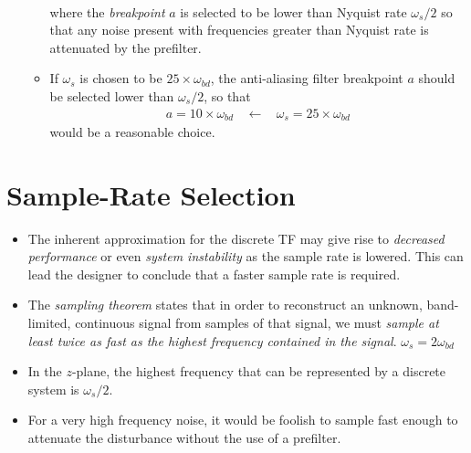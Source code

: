 \documentclass[landscape,14pt]{oblivoir}
\begin{document}
\begin{itemize}
\begin{itemize}
\begin{align*}
		\end{align*}
		where the \emph{breakpoint} $a$ is selected to be lower than Nyquist rate $\omega_s/2$ so that any noise present with frequencies greater than Nyquist rate is attenuated by the prefilter. 
		\item If $\omega_s$ is chosen to be $25 \times \omega_{bd}$, the anti-aliasing filter breakpoint $a$ should be selected lower than $\omega_s/2$, so that 
		\begin{align*}
			a = 10 \times \omega_{bd} ~~~~\leftarrow~~~~ \omega_s = 25 \times \omega_{bd} 
		\end{align*}
		would be a reasonable choice. 
	\end{itemize}
\end{itemize}
%
%
\newpage
%
\section{Sample-Rate Selection}
%
\begin{itemize}
	\item The inherent approximation for the discrete TF may give rise to \emph{decreased performance} or even \emph{system instability} as the sample rate is lowered. This can lead the designer to conclude that a faster sample rate is required. 
	\item The \emph{sampling theorem} states that in order to reconstruct an unknown, band-limited, continuous signal from samples of that signal, we must \emph{sample at least twice as fast as the highest frequency contained in the signal}. $\omega_s = 2 \omega_{bd}$  
	\item In the $z$-plane, the highest frequency that can be represented by a discrete system is $\omega_s/2$. 
	\item For a very high frequency noise, it would be foolish to sample fast enough to attenuate the disturbance without the use of a prefilter. 
\end{itemize}
%
%
\newpage
%
\end{document}
